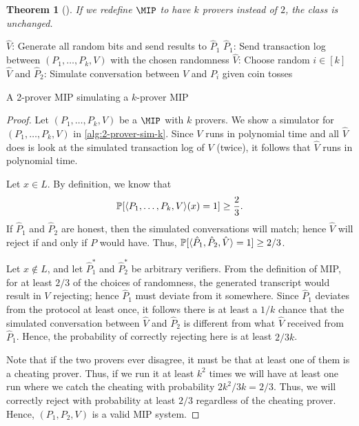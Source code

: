 \documentclass[english,12pt]{reedthesis}
\theoremstyle{plain}
\newtheorem{thm}{Theorem}[section]
\theoremstyle{definition}
\theoremstyle{remark}
\DeclarePairedDelimiter{\ang}{\langle}{\rangle}
\begin{document}
\begin{thm}[{\cite[Theorem 4]{BGKW88}}]\label{thm:mip-unchanged}
  If we redefine $\MIP$ to have $k$ provers instead of $2$, the class is unchanged.
\end{thm}

\begin{algorithm}[htbp]
  $\hat{V}$: Generate all random bits and send results to $\hat{P}_{1}$\;
  $\hat{P}_{1}$: Send transaction log between $(P_{1}, \ldots, P_{k}, V)$ with the
  chosen randomness\;
  $\hat{V}$: Choose random $i \in [k]$\;
  $\hat{V}$ and $\hat{P}_{2}$: Simulate conversation between $V$ and $P_{i}$
  given coin tosses\;
  \caption{A 2-prover MIP simulating a $k$-prover MIP}\label{alg:2-prover-sim-k}
\end{algorithm}

\begin{proof}
  Let $(P_{1}, \ldots, P_{k}, V)$ be a $\MIP$ with $k$ provers. We show a simulator
  for $(P_{1}, \ldots, P_{k}, V)$ in \cref{alg:2-prover-sim-k}. Since $V$ runs in
  polynomial time and all $\hat{V}$ does is look at the simulated transaction
  log of $V$ (twice), it follows that $\hat{V}$ runs in polynomial time.

  Let $x \in L$. By definition, we know that
  \begin{equation}
    \mathbb{P}[\ang{P_{1}, \ldots, P_{k}, V}(x) = 1] \ge \frac{2}{3}.
  \end{equation}
  If $\hat{P}_{1}$ and $\hat{P}_{2}$ are honest, then the simulated
  conversations will match; hence $\hat{V}$ will reject if and only if $P$ would
  have. Thus, $\mathbb{P}[\ang{\hat{P}_{1}, \hat{P}_{2}, \hat{V}} = 1] \ge 2/3$.

  Let $x \notin L$, and let $\hat{P}_{1}^{*}$ and $\hat{P}_{2}^{*}$ be arbitrary
  verifiers. From the definition of MIP, for at least $2/3$ of the choices of
  randomness, the generated transcript would result in $V$ rejecting; hence
  $\hat{P}_{1}$ must deviate from it somewhere. Since $\hat{P}_{1}$ deviates
  from the protocol at least once, it follows there is at least a $1/k$ chance
  that the simulated conversation between $\hat{V}$ and $\hat{P}_{2}$ is
  different from what $\hat{V}$ received from $\hat{P}_{1}$. Hence, the
  probability of correctly rejecting here is at least $2/3k$.

  Note that if the two provers ever disagree, it must be that at least one of
  them is a cheating prover. Thus, if we run it at least $k^{2}$ times we will
  have at least one run where we catch the cheating with probability
  $2k^{2}/3k = 2/3$. Thus, we will correctly reject with probability at least
  $2/3$ regardless of the cheating prover. Hence, $(P_{1}, P_{2}, V)$ is a valid
  MIP system.
\end{proof}
\end{document}
